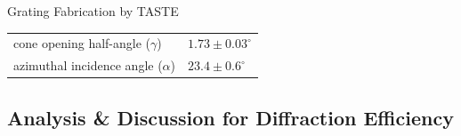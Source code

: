 \documentclass[aspectratio=169,9pt]{beamer}
\begin{document}
\begin{frame}{Grating Fabrication by TASTE}
\begin{minipage}[t]{0.54\linewidth}
\begin{table}[]
\begin{tabular}{@{}ll@{}}
cone opening half-angle ($\gamma$)                                        & $1.73 \pm 0.03^{\circ}$  \\
azimuthal incidence angle ($\alpha$)                                      & $23.4 \pm 0.6^{\circ}$ \\ \bottomrule %
\end{tabular}
\end{table}
 \end{minipage}
\end{frame}

\subsection{Analysis \& Discussion for Diffraction Efficiency}
\end{document}
